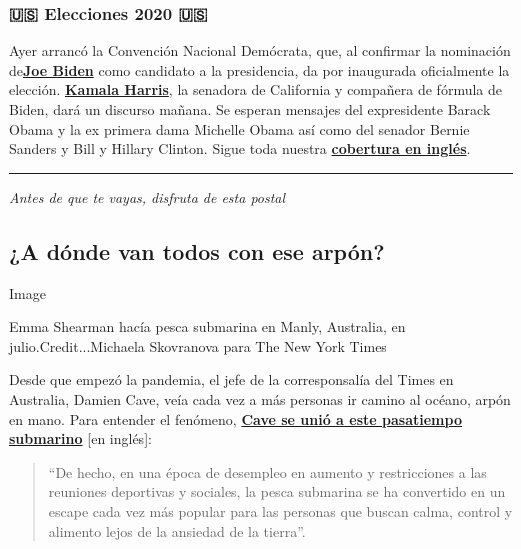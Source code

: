 \hypertarget{-elecciones-2020-}{%
\subsubsection{🇺🇸 Elecciones 2020 🇺🇸}\label{-elecciones-2020-}}

Ayer arrancó la Convención Nacional Demócrata, que, al confirmar la
nominación
de\href{https://www.nytimes3xbfgragh.onion/es/interactive/2020/espanol/estados-unidos/joe-biden-elecciones.html}{}\textbf{\href{https://www.nytimes3xbfgragh.onion/es/interactive/2020/espanol/estados-unidos/joe-biden-elecciones.html}{Joe
Biden}} como candidato a la presidencia, da por inaugurada oficialmente
la elección.
\textbf{\href{https://www.nytimes3xbfgragh.onion/es/2020/08/12/espanol/estados-unidos/quien-es-kamala-harris-vicepresidenta.html}{Kamala
Harris}}, la senadora de California y compañera de fórmula de Biden,
dará un discurso mañana. Se esperan mensajes del expresidente Barack
Obama y la ex primera dama Michelle Obama así como del senador Bernie
Sanders y Bill y Hillary Clinton. Sigue toda nuestra
\textbf{\href{https://www.nytimes3xbfgragh.onion/news-event/2020-election}{cobertura
en inglés}}.

\begin{center}\rule{0.5\linewidth}{\linethickness}\end{center}

\emph{Antes de que te vayas, disfruta de esta postal}

\hypertarget{a-duxf3nde-van-todos-con-ese-arpuxf3n}{%
\subsection{¿A dónde van todos con ese
arpón?}\label{a-duxf3nde-van-todos-con-ese-arpuxf3n}}

Image

Emma Shearman hacía pesca submarina en Manly, Australia, en
julio.Credit...Michaela Skovranova para The New York Times

Desde que empezó la pandemia, el jefe de la corresponsalía del Times en
Australia, Damien Cave, veía cada vez a más personas ir camino al
océano, arpón en mano. Para entender el fenómeno,
\textbf{\href{https://www.nytimes3xbfgragh.onion/2020/08/03/world/australia/spearfishing-sydney-coronavirus.html}{Cave
se unió a este pasatiempo submarino}} {[}en inglés{]}:

\begin{quote}
``De hecho, en una época de desempleo en aumento y restricciones a las
reuniones deportivas y sociales, la pesca submarina se ha convertido en
un escape cada vez más popular para las personas que buscan calma,
control y alimento lejos de la ansiedad de la tierra''.
\end{quote}

